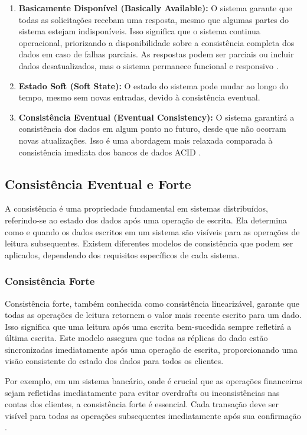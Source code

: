 \begin{enumerate}
    \item \textbf{Basicamente Disponível (Basically Available):} O sistema garante que todas as solicitações recebam uma resposta, mesmo que algumas partes do sistema estejam indisponíveis. Isso significa que o sistema continua operacional, priorizando a disponibilidade sobre a consistência completa dos dados em caso de falhas parciais. As respostas podem ser parciais ou incluir dados desatualizados, mas o sistema permanece funcional e responsivo \cite{pritchett2008}.
    \item \textbf{Estado Soft (Soft State):} O estado do sistema pode mudar ao longo do tempo, mesmo sem novas entradas, devido à consistência eventual.
    \item \textbf{Consistência Eventual (Eventual Consistency):} O sistema garantirá a consistência dos dados em algum ponto no futuro, desde que não ocorram novas atualizações. Isso é uma abordagem mais relaxada comparada à consistência imediata dos bancos de dados ACID \cite{vogels2009}.
\end{enumerate}

\subsection{Consistência Eventual e Forte}

A consistência é uma propriedade fundamental em sistemas distribuídos, referindo-se ao estado dos dados após uma operação de escrita. Ela determina como e quando os dados escritos em um sistema são visíveis para as operações de leitura subsequentes. Existem diferentes modelos de consistência que podem ser aplicados, dependendo dos requisitos específicos de cada sistema.

\subsubsection{Consistência Forte}

Consistência forte, também conhecida como consistência linearizável, garante que todas as operações de leitura retornem o valor mais recente escrito para um dado. Isso significa que uma leitura após uma escrita bem-sucedida sempre refletirá a última escrita. Este modelo assegura que todas as réplicas do dado estão sincronizadas imediatamente após uma operação de escrita, proporcionando uma visão consistente do estado dos dados para todos os clientes.

Por exemplo, em um sistema bancário, onde é crucial que as operações financeiras sejam refletidas imediatamente para evitar overdrafts ou inconsistências nas contas dos clientes, a consistência forte é essencial. Cada transação deve ser visível para todas as operações subsequentes imediatamente após sua confirmação \cite{hewitt2010}.

